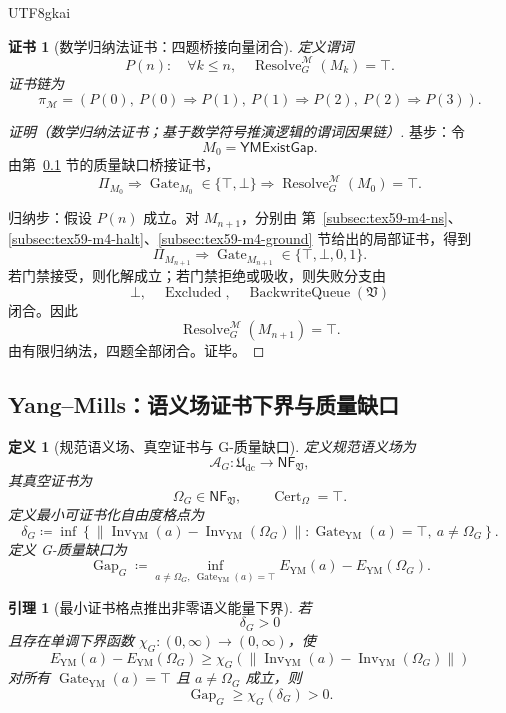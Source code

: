 \documentclass[12pt]{article}
\newtheorem{definition}{定义}[section]
\newtheorem{lemma}{引理}[section]
\newtheorem{Certificate}{证书}[section]
\newcommand{\Udc}{\mathfrak{U}_{\mathrm{dc}}}
\newcommand{\Vsys}{\mathfrak V}
\newcommand{\NF}{\mathsf{NF}}
\newcommand{\DefEq}{\coloneqq}
\DeclareMathOperator{\Cert}{Cert}
\DeclareMathOperator{\Resolve}{Resolve}
\DeclareMathOperator{\Gate}{Gate}
\DeclareMathOperator{\Inv}{Inv}
\DeclareMathOperator{\BackwriteQueue}{BackwriteQueue}
\DeclareMathOperator{\Excluded}{Excluded}
\DeclareMathOperator{\Gap}{Gap}
\begin{document}
\begin{CJK*}{UTF8}{gkai}
\begin{Certificate}[数学归纳法证书：四题桥接向量闭合]
\label{cert:tex59-m4-induction}
定义谓词
\[
  P(n):
  \quad
  \forall k\le n,\quad
  \Resolve_G^{\mathcal M}(M_k)=\top.
\]
证书链为
\[
  \pi_{\mathcal M}
  =
  \left(
  P(0),\
  P(0)\Rightarrow P(1),\
  P(1)\Rightarrow P(2),\
  P(2)\Rightarrow P(3)
  \right).
\]
\end{Certificate}

\begin{proof}[证明（数学归纳法证书；基于数学符号推演逻辑的谓词因果链）]
基步：令
\[
  M_0=\mathsf{YMExistGap}.
\]
由第~\ref{subsec:tex59-m4-ym} 节的质量缺口桥接证书，
\[
  \Pi_{M_0}
  \Longrightarrow
  \Gate_{M_0}\in\{\top,\bot\}
  \Longrightarrow
  \Resolve_G^{\mathcal M}(M_0)=\top.
\]

归纳步：假设 \(P(n)\) 成立。对 \(M_{n+1}\)，分别由
第~\ref{subsec:tex59-m4-ns}、\ref{subsec:tex59-m4-halt}、\ref{subsec:tex59-m4-ground}
节给出的局部证书，得到
\[
  \Pi_{M_{n+1}}
  \Longrightarrow
  \Gate_{M_{n+1}}\in\{\top,\bot,0,1\}.
\]
若门禁接受，则化解成立；若门禁拒绝或吸收，则失败分支由
\[
  \bot,\quad \Excluded,\quad \BackwriteQueue(\Vsys)
\]
闭合。因此
\[
  \Resolve_G^{\mathcal M}(M_{n+1})=\top.
\]
由有限归纳法，四题全部闭合。证毕。
\end{proof}

\subsection{Yang--Mills：语义场证书下界与质量缺口}
\label{subsec:tex59-m4-ym}

\begin{definition}[规范语义场、真空证书与 G-质量缺口]
\label{def:tex59-ym-gap-bridge}
定义规范语义场为
\[
  \mathcal A_G:
  \Udc\longrightarrow\NF_{\Vsys},
\]
其真空证书为
\[
  \Omega_G\in\NF_{\Vsys},
  \qquad
  \Cert_{\Omega}=\top.
\]
定义最小可证书化自由度格点为
\[
  \delta_G
  \DefEq
  \inf\left\{
  \|\Inv_{\mathrm{YM}}(a)-\Inv_{\mathrm{YM}}(\Omega_G)\|:
  \Gate_{\mathrm{YM}}(a)=\top,\ a\ne\Omega_G
  \right\}.
\]
定义 G-质量缺口为
\[
  \Gap_G
  \DefEq
  \inf_{a\ne\Omega_G,\ \Gate_{\mathrm{YM}}(a)=\top}
  E_{\mathrm{YM}}(a)-E_{\mathrm{YM}}(\Omega_G).
\]
\end{definition}

\begin{lemma}[最小证书格点推出非零语义能量下界]
\label{lem:tex59-ym-gap-lower-bound}
若
\[
  \delta_G>0
\]
且存在单调下界函数 \(\chi_G:(0,\infty)\to(0,\infty)\)，使
\[
  E_{\mathrm{YM}}(a)-E_{\mathrm{YM}}(\Omega_G)
  \ge
  \chi_G\left(
  \|\Inv_{\mathrm{YM}}(a)-\Inv_{\mathrm{YM}}(\Omega_G)\|
  \right)
\]
对所有 \(\Gate_{\mathrm{YM}}(a)=\top\) 且 \(a\ne\Omega_G\) 成立，则
\[
  \Gap_G\ge \chi_G(\delta_G)>0.
\]
\end{lemma}


\end{CJK*}
\end{document}

